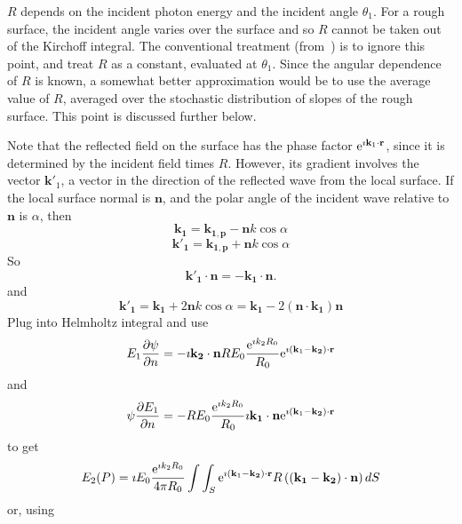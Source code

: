 \documentclass[11pt]{article}
\newcommand{\pder}[2]{\frac{\partial {#1}}{\partial {#2}}}
\newcommand{\e}{{\rm e}}
\newcommand{\bm}[1]{\mathbf{#1}}
\begin{document}
{{{{$R$ depends on the incident photon energy and the incident angle
$\theta_{1}$. For a rough surface, the incident angle varies over the
surface and so $R$ cannot be taken out of the Kirchoff integral. The
conventional treatment (from~\cite{b:beckmann}) is to ignore this point, and
treat $R$ as a constant, evaluated at $\theta_{1}$.  Since the angular
dependence of $R$ is known, a somewhat better approximation would be
to use the average value of $R$, averaged over the stochastic
distribution of slopes of the rough surface. This point is discussed
further below.

Note that the reflected field on the surface has the phase factor
$\e^{\imath\bm{k}_{1}\cdot\bm{r}}$, since it is determined by the
incident field times $R$. However, its gradient involves the vector
$\bm{k'}_{1}$, a vector in the direction of the reflected wave from
the local surface. If the local surface normal is $\bm n$, and the
polar angle of the incident wave relative to $\bm n$ is $\alpha$, then
  \begin{equation}
\bm {k_{1}}=\bm {k_{1,p}}-\bm{n}k\cos{\alpha}
  \end{equation} 
  \begin{equation}
\bm {k'_{1}}=\bm
{k_{1,p}}+\bm{n}k\cos{\alpha}
  \end{equation} So
  \begin{equation}
\bm{k'_{1}}\cdot\bm{n}=-\bm{k_{1}}\cdot\bm{n}.
  \end{equation}
and 
  \begin{equation}
\bm
{k'_{1}}=\bm {k_{1}}+2\bm{n}k\cos{\alpha}=\bm
{k_{1}}-2(\bm{n}\cdot\bm{k_{1}})\bm{n}
  \end{equation}
Plug into Helmholtz integral  and use
  \begin{equation}
E_{1}\pder{\psi}{n}=-\imath\bm{k_{2}}\cdot\bm{n}RE_{0}
\frac{\e^{\imath k_{2}R_{0}}}{R_{0}}\e^{\imath(\bm{k}_{1}-\bm{k_{2}})\cdot\bm{r}}
  \end{equation}
and
  \begin{equation}
\psi\pder{E_{1}}{n}=-RE_{0}\frac{\e^{\imath k_{2}R_{0}}}{R_{0}}\imath\bm{k_{1}}\cdot\bm{n}
\e^{\imath(\bm{k}_{1}-\bm{k_{2}})\cdot\bm{r}}
  \end{equation}
to get
  \begin{equation}
E_{2}(P)=\imath E_{0}\frac{\e^{\imath k_{2}R_{0}}}
{4\pi R_{0}}\int\int_{S}\e^{\imath(\bm{k}_{1}-\bm{k_{2}})\cdot\bm{r}}R
\left((\bm{k_{1}}-\bm{k_{2}})\cdot\bm{n}\right)dS
  \end{equation}
or, using
  \begin{equation}

\end{equation}}}}}
\end{document}
